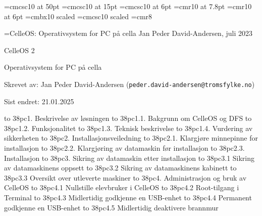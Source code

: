 



\font\ftitteltop=cmcsc10 at 50pt
\font\ftittelbottom=cmcsc10 at 15pt
\font\ftopptekst=cmcsc10 at 6pt
\font\ftopptekststor=cmr10 at 7.8pt
\font\fforfatter=cmr10 at 6pt
\font\fs=cmbx10 scaled
\font\fss=cmcsc10 scaled
\font\fc=cmr8

\def\imagewithcaption#1#2#3{
\centerline{
\vbox{\hbox{\epsfxsize #1 \epsffile{#2}}
\vskip 2pt
\hbox{\raise 4pt \vbox{\hsize=#1 \noindent \fc \baselineskip=9pt #3}}}}}

\headline={\ftopptekst CelleOS: Operativsystem for PC p\aa{} cella \hfill \fforfatter Jan Peder David-Andersen, juli 2023}

\topglue 6pc
\centerline{\ftitteltop CelleOS 2}
\vskip 12pt
\centerline{\ftittelbottom Operativsystem for PC p\aa{} cella}
\vskip 8pc

\noindent Skrevet av: Jan Peder David-Andersen ({\tt peder.david-andersen@tromsfylke.no})

\noindent Sist endret: 21.01.2025

\vskip 3pc
\def\tocwidth{38pc}


\hbox to \tocwidth{1. Beskrivelse av l\o sningen }
\smallskip
\hbox to \tocwidth{1.1. Bakgrunn om CelleOS og DFS }
\hbox to \tocwidth{1.2. Funksjonalitet }
\hbox to \tocwidth{1.3. Teknisk beskrivelse }
\hbox to \tocwidth{1.4. Vurdering av sikkerheten }
\medskip
\hbox to \tocwidth{2. Installasjonsveiledning }
\smallskip
\hbox to \tocwidth{2.1. Klargj\o re minnepinne for installasjon }
\hbox to \tocwidth{2.2. Klargj\o ring av datamaskin f\o r installasjon }
\hbox to \tocwidth{2.3. Installasjon }
\medskip
\hbox to \tocwidth{3. Sikring av datamaskin etter installasjon }
\smallskip
\hbox to \tocwidth{3.1 Sikring av datamaskinens oppsett }
\hbox to \tocwidth{3.2 Sikring av datamaskinens kabinett }
\hbox to \tocwidth{3.3 Oversikt over utleverte maskiner }
\medskip
\hbox to \tocwidth{4. Administrasjon og bruk av CelleOS }
\smallskip
\hbox to \tocwidth{4.1 Nullstille elevbruker i CelleOS }
\hbox to \tocwidth{4.2 Root-tilgang i Terminal }
\hbox to \tocwidth{4.3 Midlertidig godkjenne en USB-enhet }
\hbox to \tocwidth{4.4 Permanent godkjenne en USB-enhet }
\hbox to \tocwidth{4.5 Midlertidig deaktivere brannmur }



